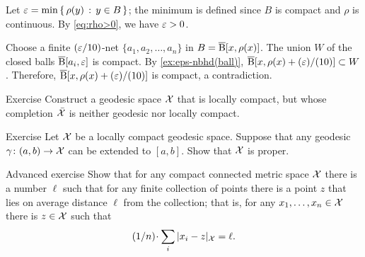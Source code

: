 Let $\varepsilon=\min\left\{\,{\rho(y)}\,:\,{y\in B}\,\right\}$; the minimum is defined since $B$ is compact and $\rho$ is continuous.
By \ref{eq:rho>0}, we have $\varepsilon>0$.

Choose a finite $(\varepsilon/10)$-net $\{a_1,a_2,\dots,a_n\}$ in $B=\overline{\mathrm{B}}{}[x,\rho(x)]$.
The union $W$ of the closed balls $\overline{\mathrm{B}}{}[a_i,\varepsilon]$ is compact.
By \ref{ex:eps-nbhd(ball)},
$\overline{\mathrm{B}}{}[x,\rho(x)+(\varepsilon)/(10)]\subset W$.
Therefore, $\overline{\mathrm{B}}{}[x,\rho(x)+(\varepsilon)/(10)]$ is compact,
a contradiction.
\qeds

\begin{thm}{Exercise}\label{exercise from BH}
Construct a geodesic space $\mathcal{X}$ that is locally compact,
but whose completion $\bar{\mathcal{X}}$ is neither geodesic nor locally compact.
\end{thm}




\begin{thm}{Exercise}\label{ex:HR}
Let $\mathcal{X}$ be a locally compact geodesic space.
Suppose that any geodesic $\gamma\colon(a,b)\to\mathcal{X}$ can be extended to $[a,b]$.
Show that $\mathcal{X}$ is proper.
\end{thm}


\begin{thm}{Advanced exercise}\label{ex:gross}
Show that for any compact connected metric space $\mathcal{X}$ there is a number $\ell$ such that for any finite collection of points there is a point $z$ that lies on average distance $\ell$ from the collection;
that is, for any $x_1,\dots,x_n\in \mathcal{X}$ there is $z\in \mathcal{X}$ such that
\[\tfrac1n\cdot\sum_i|x_i-z|_{\spc{X}}=\ell.\]
\end{thm}






